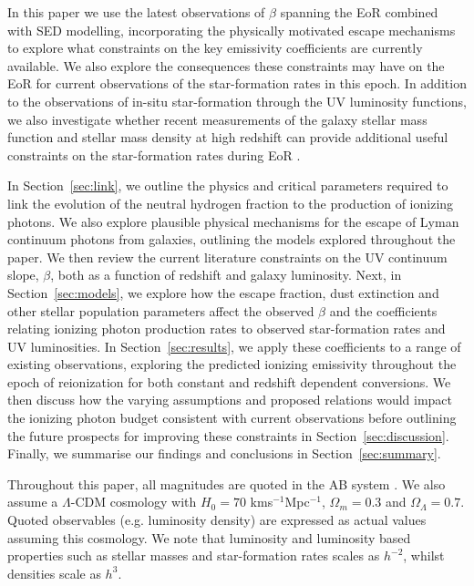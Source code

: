In this paper we use the latest observations of $\beta$ spanning the EoR combined with SED modelling, incorporating the physically motivated escape mechanisms to explore what constraints on the key emissivity coefficients are currently available. We also explore the consequences these constraints may have on the EoR for current observations of the star-formation rates in this epoch. In addition to the observations of in-situ star-formation through the UV luminosity functions, we also investigate whether recent measurements of the galaxy stellar mass function and stellar mass density at high redshift \citep{Duncan:2014gh,Grazian:2014vx} can provide additional useful constraints on the star-formation rates during EoR \citep{Stark:2007gi,Gonzalez:2010hm}.

In Section~\ref{sec:link}, we outline the physics and critical parameters required to link the evolution of the neutral hydrogen fraction to the production of ionizing photons. We also explore plausible physical mechanisms for the escape of Lyman continuum photons from galaxies, outlining the models explored throughout the paper. We then review the current literature constraints on the UV continuum slope, $\beta$, both as a function of redshift and galaxy luminosity. Next, in Section~\ref{sec:models}, we explore how the escape fraction, dust extinction and other stellar population parameters affect the observed $\beta$ and the coefficients relating ionizing photon production rates to observed star-formation rates and UV luminosities. In Section~\ref{sec:results}, we apply these coefficients to a range of existing observations, exploring the predicted ionizing emissivity throughout the epoch of reionization for both constant and redshift dependent conversions. We then discuss how the varying assumptions and proposed relations would impact the ionizing photon budget consistent with current observations before outlining the future prospects for improving these constraints in Section~\ref{sec:discussion}. Finally, we summarise our findings and conclusions in Section~\ref{sec:summary}.

Throughout this paper, all magnitudes are quoted in the AB system \citep{1983ApJ...266..713O}. We also assume a $\Lambda$-CDM cosmology with $H_{0} = 70$ kms$^{-1}$Mpc$^{-1}$, $\Omega_{m}=0.3$ and $\Omega_{\Lambda}=0.7$. Quoted observables (e.g. luminosity density) are expressed as actual values assuming this cosmology. We note that luminosity and luminosity based properties such as stellar masses and star-formation rates scales as $h^{-2}$, whilst densities scale as $h^{3}$.

